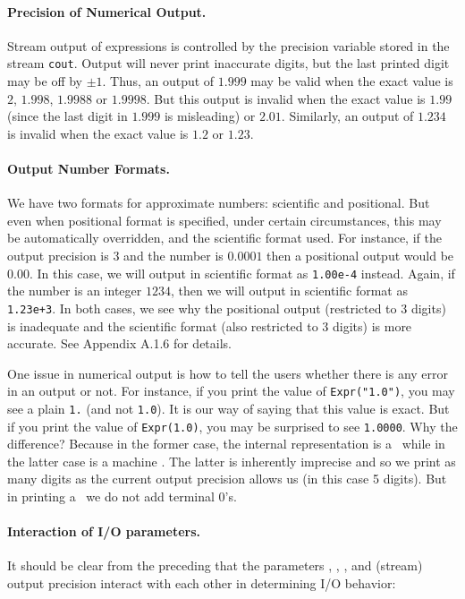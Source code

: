 \documentclass[12pt]{article}
\begin{document}
\paragraph{Precision of Numerical Output.}
Stream output of expressions is controlled by the
precision variable stored in the stream {\tt cout}.
Output will never print inaccurate digits,
but the last printed digit may be off by $\pm 1$.  
Thus, an output of $1.999$
may be valid when the exact value is $2$, $1.998$, $1.9988$ or $1.9998$.
But this output is invalid when the exact value is $1.99$ (since
the last digit in $1.999$ is misleading) or $2.01$.
Similarly,
an output of $1.234$ is invalid when the exact value is $1.2$ or $1.23$.

\paragraph{Output Number Formats.}
We have two formats for approximate numbers:
scientific and positional.  But
even when positional format is specified, under certain
circumstances, this may be automatically overridden,
and the scientific format used.  
For instance, if the output precision is $3$ and the number
is $0.0001$ then a positional output would be $0.00$.  In this
case, we will output in scientific format as {\tt 1.00e-4} instead.
Again, if the number is an integer $1234$, then we will output in
scientific format as {\tt 1.23e+3}.  
In both cases, we see why the positional output (restricted
to 3 digits) is inadequate and the scientific format (also
restricted to 3 digits) is more accurate.
See Appendix A.1.6 for details.

One issue in numerical output is how to tell the 
users whether there is any error in an output or not.
For instance, if you print the value of \texttt{Expr("1.0")},
you may see a plain \texttt{1.} (and not \texttt{1.0}).
It is our way of saying that this value is exact.
But if you print the value of \texttt{Expr(1.0)}, you may be surprised to
see \texttt{1.0000}.  Why the difference? Because in the former
case, the internal representation is a \Rat\ while
in the latter case is a machine \double.  The latter is
inherently imprecise and so we print as many digits as the
current output precision allows us (in this case 5 digits).
But in printing a \Rat\ we do not add terminal $0$'s.

\paragraph{Interaction of I/O parameters.}
It should be clear from the preceding
that the parameters , , , and (stream) output precision
interact with each other in determining I/O behavior:
\end{document}
